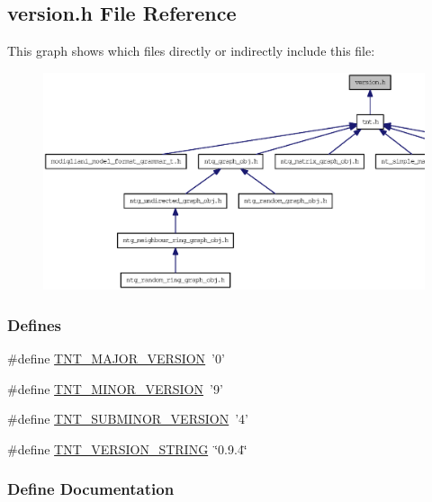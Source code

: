 \subsection{version.h File Reference}
\label{version_8h}
This graph shows which files directly or indirectly include this file:
\nopagebreak
\begin{figure}[H]
\begin{center}
\leavevmode
\includegraphics[width=400pt]{version_8h__dep__incl}
\end{center}
\end{figure}
\subsubsection*{Defines}
\begin{DoxyCompactItemize}
\item 
\#define \hyperlink{version_8h_a6a88a6dea9c419210729daf837322fe3}{TNT\_\-MAJOR\_\-VERSION}~'0'
\item 
\#define \hyperlink{version_8h_a49bea0c72b4fc3f5258da88311a4f1bb}{TNT\_\-MINOR\_\-VERSION}~'9'
\item 
\#define \hyperlink{version_8h_ab64cd74122bb83c94bece7d71a9688b8}{TNT\_\-SUBMINOR\_\-VERSION}~'4'
\item 
\#define \hyperlink{version_8h_ae04b53d8f5fd5ba6e4da36985614c39e}{TNT\_\-VERSION\_\-STRING}~\char`\"{}0.9.4\char`\"{}
\end{DoxyCompactItemize}


\subsubsection{Define Documentation}

